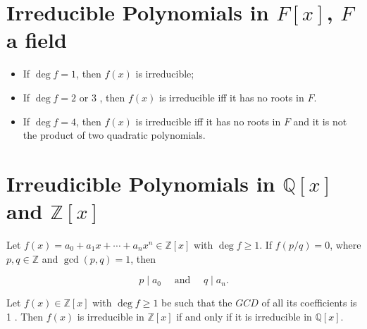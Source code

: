 \section{Irreducible Polynomials in \(F[x]\), \(F\) a field}

\begin{proposition}
  \begin{itemize}\emph{}
\item[1.] If \(\operatorname{deg} f=1\), then \(f(x)\) is irreducible;
\item[2.] If \(\operatorname{deg} f=2\) or 3 , then \(f(x)\) is irreducible iff it has no roots in \(F\).
\item[3.] If \(\operatorname{deg} f=4\), then \(f(x)\) is irreducible iff it has no roots in \(F\) and it is not the product of two quadratic polynomials.
\end{itemize}
\end{proposition}

\begin{proofidea}
  
  
\end{proofidea}
  
\begin{formalproof}
  
\end{formalproof}

\section{Irreudicible Polynomials in \(\mathbb{Q}[x]\) and \(\mathbb{Z}[x]\)}


\begin{proposition}
  Let \(f(x)=a_0+a_1 x+\cdots+a_n x^n \in \mathbb{Z}[x]\) with \(\operatorname{deg} f \geq 1\). If \(f(p / q)=0\), where \(p, q \in \mathbb{Z}\) and \(\operatorname{gcd}(p, q)=1\), then

\[
p \mid a_0 \quad \text { and } \quad q \mid a_n .
\]
\end{proposition}

\begin{proofidea}
  
  
\end{proofidea}
  
\begin{formalproof}
  
\end{formalproof} 

\begin{theorem}
Let \(f(x) \in \mathbb{Z}[x]\) with \(\operatorname{deg} f \geq 1\) be such that the \(G C D\) of all its coefficients is 1 . Then \(f(x)\) is irreducible in \(\mathbb{Z}[x]\) if and only if it is irreducible in \(\mathbb{Q}[x]\).
\end{theorem}


